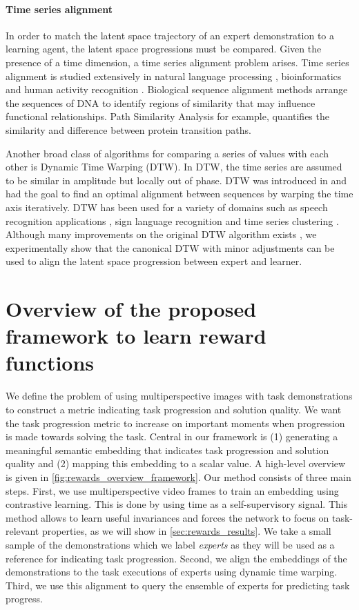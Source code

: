 \documentclass[\home/main.tex]{subfiles}
\begin{document}
\paragraph{Time series alignment}
In order to match the latent space trajectory of an expert demonstration to a learning agent, the latent space progressions must be compared. Given the presence of a time dimension, a time series alignment problem arises. Time series alignment is studied extensively in natural language processing \autocite{Myers1980}, bioinformatics \autocite{Seyler2015path} and human activity recognition \autocite{Machado2015}. Biological sequence alignment methods arrange the sequences of DNA to identify regions of similarity that may influence functional relationships. Path Similarity Analysis \autocite{Seyler2015path} for example, quantifies the similarity and difference between protein transition paths.

Another broad class of algorithms for comparing a series of values with each other is Dynamic Time Warping (DTW). In DTW, the time series are assumed to be similar in amplitude but locally out of phase. DTW was introduced in \autocite{Bellman1959} and had the goal to find an optimal alignment between sequences by warping the time axis iteratively. DTW has been used for a variety of domains such as speech recognition applications \autocite{Myers1980}, sign language recognition \autocite{Kuzmanic2007} and time series clustering \autocite{Niennattrakul2007}. Although many improvements on the original DTW algorithm exists \autocite{Folgado2018}, we experimentally show that the canonical DTW with minor adjustments can be used to align the latent space progression between expert and learner.


\section{Overview of the proposed framework to learn reward functions} \label{sec:rewards_overview}
We define the problem of using multiperspective images with task demonstrations to construct a metric indicating task progression and solution quality. We want the task progression metric to increase on important moments when progression is made towards solving the task. Central in our framework is (1) generating a meaningful semantic embedding that indicates task progression and solution quality and (2) mapping this embedding to a scalar value. A high-level overview is given in \cref{fig:rewards_overview_framework}. Our method consists of three main steps. First, we use multiperspective video frames to train an embedding using contrastive learning. This is done by using time as a self-supervisory signal. This method allows to learn useful invariances and forces the network to focus on task-relevant properties, as we will show in \cref{sec:rewards_results}. We take a small sample of the demonstrations which we label \textit{experts} as they will be used as a reference for indicating task progression. Second, we align the embeddings of the demonstrations to the task executions of experts using dynamic time warping. Third, we use this alignment to query the ensemble of experts for predicting task progress.
\end{document}
